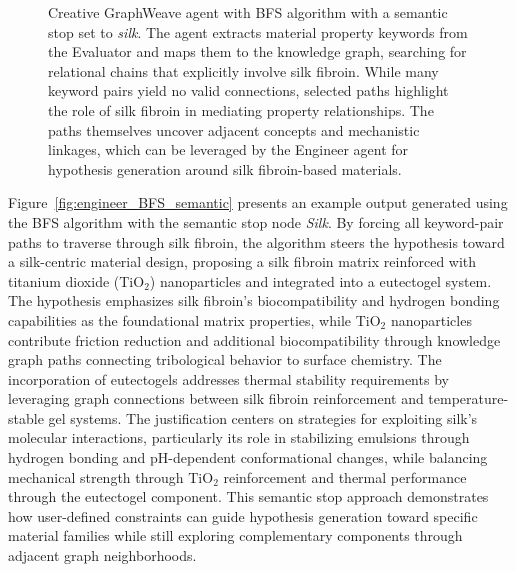 \begin{figure}[htbp]
\begin{mdframed}
  \end{mdframed}
  
  \caption{Creative GraphWeave agent with BFS algorithm with a semantic stop set to \textit{silk}. The agent extracts material property keywords from the Evaluator and maps them to the knowledge graph, searching for relational chains that explicitly involve silk fibroin. While many keyword pairs yield no valid connections, selected paths highlight the role of silk fibroin in mediating property relationships. The paths themselves uncover adjacent concepts and mechanistic linkages, which can be leveraged by the Engineer agent for hypothesis generation around silk fibroin-based materials.}
  \label{fig:silk_fibroin_paths}
\end{figure}

Figure~\ref{fig:engineer_BFS_semantic} presents an example output generated using the BFS algorithm with the semantic stop node \textit{Silk}. By forcing all keyword-pair paths to traverse through silk fibroin, the algorithm steers the hypothesis toward a silk-centric material design, proposing a silk fibroin matrix reinforced with titanium dioxide (TiO$_2$) nanoparticles and integrated into a eutectogel system. The hypothesis emphasizes silk fibroin's biocompatibility and hydrogen bonding capabilities as the foundational matrix properties, while TiO$_2$ nanoparticles contribute friction reduction and additional biocompatibility through knowledge graph paths connecting tribological behavior to surface chemistry. The incorporation of eutectogels addresses thermal stability requirements by leveraging graph connections between silk fibroin reinforcement and temperature-stable gel systems. The justification centers on strategies for exploiting silk's molecular interactions, particularly its role in stabilizing emulsions through hydrogen bonding and pH-dependent conformational changes, while balancing mechanical strength through TiO$_2$ reinforcement and thermal performance through the eutectogel component. This semantic stop approach demonstrates how user-defined constraints can guide hypothesis generation toward specific material families while still exploring complementary components through adjacent graph neighborhoods.






